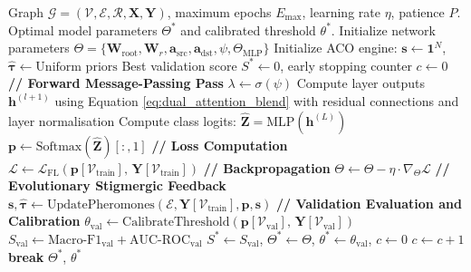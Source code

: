 \vspace{0.3cm}

\begin{algorithm}[H]
\caption{ACO-GNN End-to-End Training and Optimization Loop}
\label{alg:training_pipeline}
\begin{algorithmic}[1]
\Require Graph $\mathcal{G} = (\mathcal{V}, \mathcal{E}, \mathcal{R}, \mathbf{X}, \mathbf{Y})$, maximum epochs $E_{\max}$, learning rate $\eta$, patience $P$.
\Ensure Optimal model parameters $\Theta^*$ and calibrated threshold $\theta^*$.
\State Initialize network parameters $\Theta = \{\mathbf{W}_{\text{root}}, \mathbf{W}_r, \mathbf{a}_{\text{src}}, \mathbf{a}_{\text{dst}}, \psi, \Theta_{\text{MLP}}\}$
\State Initialize ACO engine: $\mathbf{s} \leftarrow \mathbf{1}^N$, $\hat{\boldsymbol{\tau}} \leftarrow \text{Uniform priors}$
\State Best validation score $S^* \leftarrow 0$, early stopping counter $c \leftarrow 0$
    \State \textbf{// Forward Message-Passing Pass}
    \State $\lambda \leftarrow \sigma(\psi)$
    \State Compute layer outputs $\mathbf{h}^{(l+1)}$ using Equation \ref{eq:dual_attention_blend} with residual connections and layer normalisation
    \State Compute class logits: $\hat{\mathbf{Z}} = \text{MLP}(\mathbf{h}^{(L)})$
    \State $\mathbf{p} \leftarrow \text{Softmax}(\hat{\mathbf{Z}})[:, 1]$ 
    \State \textbf{// Loss Computation}
    \State $\mathcal{L} \leftarrow \mathcal{L}_{\text{FL}}\left(\mathbf{p}[\mathcal{V}_{\text{train}}], \, \mathbf{Y}[\mathcal{V}_{\text{train}}]\right)$
    \State \textbf{// Backpropagation}
    \State $\Theta \leftarrow \Theta - \eta \cdot \nabla_\Theta \mathcal{L}$
    \State \textbf{// Evolutionary Stigmergic Feedback}
    \State $\mathbf{s}, \hat{\boldsymbol{\tau}} \leftarrow \text{UpdatePheromones}(\mathcal{E}, \mathbf{Y}[\mathcal{V}_{\text{train}}], \mathbf{p}, \mathbf{s})$ 
    \State \textbf{// Validation Evaluation and Calibration}
    \State $\theta_{\text{val}} \leftarrow \text{CalibrateThreshold}(\mathbf{p}[\mathcal{V}_{\text{val}}], \, \mathbf{Y}[\mathcal{V}_{\text{val}}])$ 
    \State $S_{\text{val}} \leftarrow \text{Macro-F1}_{\text{val}} + \text{AUC-ROC}_{\text{val}}$ 
        \State $S^* \leftarrow S_{\text{val}}$, $\Theta^* \leftarrow \Theta$, $\theta^* \leftarrow \theta_{\text{val}}$, $c \leftarrow 0$
    \Else
        \State $c \leftarrow c + 1$
            \State \textbf{break} 
        \EndIf
    \EndIf
\EndFor
\State \Return $\Theta^*$, $\theta^*$
\end{algorithmic}
\end{algorithm}

